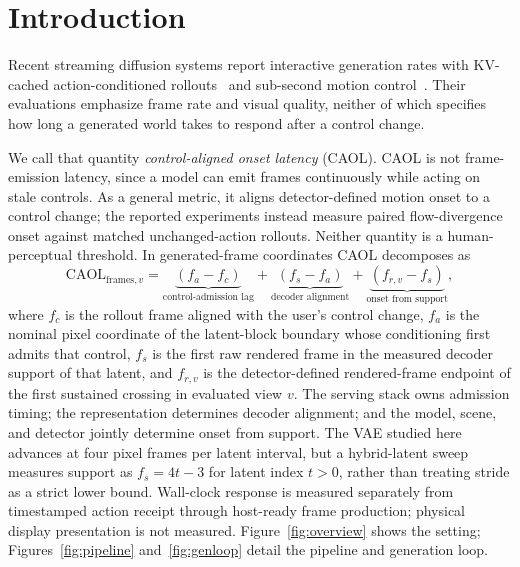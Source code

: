 \documentclass[11pt]{article}
\newcommand{\caol}{CAOL}
\begin{document}
\section{Introduction}
\label{sec:intro}

Recent streaming diffusion systems report interactive generation rates with KV-cached action-conditioned rollouts~\cite{causvid,selfforcing} and sub-second motion control~\cite{motionstream}. Their evaluations emphasize frame rate and visual quality, neither of which specifies how long a generated world takes to respond after a control change.

We call that quantity \emph{control-aligned onset latency} (\caol{}). \caol{} is not frame-emission latency, since a model can emit frames continuously while acting on stale controls. As a general metric, it aligns detector-defined motion onset to a control change; the reported experiments instead measure paired flow-divergence onset against matched unchanged-action rollouts. Neither quantity is a human-perceptual threshold. In generated-frame coordinates \caol{} decomposes as
\[
\mathrm{\caol}_{\mathrm{frames},v}
= \underbrace{(f_a-f_c)}_{\text{control-admission lag}}
+ \underbrace{(f_s-f_a)}_{\text{decoder alignment}}
+ \underbrace{(f_{r,v}-f_s)}_{\text{onset from support}},
\]
where $f_c$ is the rollout frame aligned with the user's control change, $f_a$ is the nominal pixel coordinate of the latent-block boundary whose conditioning first admits that control, $f_s$ is the first raw rendered frame in the measured decoder support of that latent, and $f_{r,v}$ is the detector-defined rendered-frame endpoint of the first sustained crossing in evaluated view $v$. The serving stack owns admission timing; the representation determines decoder alignment; and the model, scene, and detector jointly determine onset from support. The VAE studied here advances at four pixel frames per latent interval, but a hybrid-latent sweep measures support as $f_s=4t-3$ for latent index $t>0$, rather than treating stride as a strict lower bound. Wall-clock response is measured separately from timestamped action receipt through host-ready frame production; physical display presentation is not measured. Figure~\ref{fig:overview} shows the setting; Figures~\ref{fig:pipeline} and~\ref{fig:genloop} detail the pipeline and generation loop.
\end{document}
